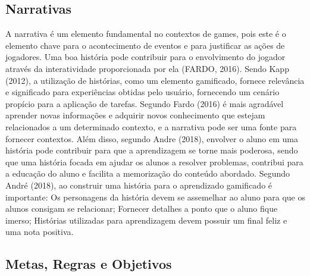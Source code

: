 \documentclass[
	12pt,				%
	oneside,			%
	a4paper,			%
	english,			%
	french,				%
	spanish,			%
	brazil,				%
	]{abntex2}
\begin{document}
\subsection{Narrativas}

A narrativa é um elemento fundamental no contextos de games, pois este é o elemento chave para o acontecimento de eventos e para justificar as ações de jogadores. Uma boa história pode contribuir para o envolvimento do jogador através da interatividade proporcionada por ela  (FARDO, 2016). Sendo Kapp (2012), a utilização de histórias, como um elemento gamificado, fornece relevância e significado para experiências obtidas pelo usuário, fornecendo um cenário propício para a aplicação de tarefas.
	Segundo Fardo (2016) é mais agradável aprender novas informações e adquirir novos conhecimento que estejam relacionados a um determinado contexto, e a narrativa pode ser uma fonte para fornecer contextos. Além disso, segundo Andre (2018), envolver o aluno em uma história pode contribuir para que a aprendizagem se torne mais poderosa, sendo que uma história focada em ajudar os alunos a resolver problemas, contribui para a educação do aluno e facilita a memorização do conteúdo abordado.
	Segundo André (2018), ao construir uma história para o aprendizado gamificado é importante:
Os personagens da história devem se assemelhar ao aluno para que os alunos consigam se relacionar;
Fornecer detalhes a ponto que o aluno fique imerso;
Histórias utilizadas para aprendizagem devem possuir um final feliz e uma nota positiva.

\subsection{Metas, Regras e Objetivos}
\end{document}
